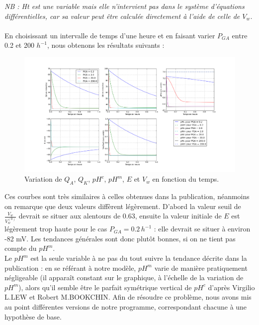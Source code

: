 \documentclass[a4paper,fleqn]{article}
\begin{document}
\textit{NB : Ht est une variable mais elle n'intervient pas dans le système d'équations différentielles, car sa valeur peut être calculée directement à l'aide de celle de $V_w$.}\\
\\

En choisissant un intervalle de temps d'une heure et en faisant varier $P_{GA}$ entre 0.2 et 200 $h^{-1}$, nous obtenons les résultats suivants :

\begin{figure}[H]
\centering 
\includegraphics[width=1.1\textwidth]{original_hum.png}
\caption{Variation de $Q_{A}$, $Q_{K}$, $pH^{c}$, $pH^{m}$, $E$ et $V_{w}$ en fonction du temps.}
\end{figure} 

 


Ces courbes sont très similaires à celles obtenues dans la publication, néanmoins on remarque que deux valeurs diffèrent légèrement. D'abord la valeur seuil de $\frac{V_w}{V_w^{(0)}}$ devrait se situer aux alentours de 0.63, ensuite la valeur initiale de $E$ est légèrement trop haute pour le cas $P_{GA} = 0.2\,h^{-1}$ : elle devrait se situer à environ -82 mV. Les tendances générales sont donc plutôt bonnes, si on ne tient pas compte du $pH^m$.\\

Le $pH^m$ est la seule variable à ne pas du tout suivre la tendance décrite dans la publication : en se référant à notre modèle, $pH^m$ varie de manière pratiquement négligeable (il apparaît constant sur le graphique, à l'échelle de la variation de $pH^m$), alors qu'il semble être le parfait symétrique vertical de $pH^c$ d'après Virgilio L.LEW et Robert M.BOOKCHIN. Afin de résoudre ce problème, nous avons mis au point différentes versions de notre programme, correspondant chacune à une hypothèse de base.
\end{document}
